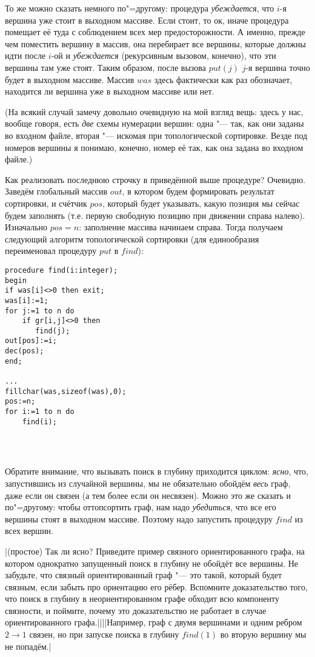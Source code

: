 То же можно сказать немного по"=другому: процедура \textit{убеждается}, что $i$-я  вершина уже 
стоит в выходном массиве. Если стоит, то ок, иначе процедура помещает её туда с соблюдением всех мер 
предосторожности. А именно, прежде чем поместить вершину в массив, она перебирает все вершины, 
которые должны идти после $i$-ой и \textit{убеждается} (рекурсивным вызовом, конечно), что эти 
вершины там уже стоят. Таким образом, после вызова $put(j)$ $j$-я вершина точно будет в выходном 
массиве. Массив $was$ здесь фактически как раз обозначает, находится ли вершина уже в 
выходном массиве или нет.

(На всякий случай замечу довольно очевидную на мой взгляд вещь: здесь у нас, вообще говоря, есть 
\textit{две} схемы нумерации вершин: одна "--- так, как они заданы во входном файле, вторая "--- 
искомая при топологической сортировке. Везде под номеров вершины я понимаю, конечно, номер её так, 
как она задана во входном файле.)

Как реализовать последнюю строчку в приведённой выше процедуре? Очевидно. Заведём глобальный массив 
$out$, в котором будем формировать результат сортировки, и счётчик $pos$, который будет указывать, 
какую позиция мы сейчас будем заполнять (т.е. первую свободную позицию при движении справа налево). 
Изначально $pos=n$: заполнение массива начинаем 
справа. Тогда получаем следующий алгоритм топологической сортировки (для единообразия переименовал 
процедуру $put$ в $find$):
\begin{codesample}\begin{verbatim}
procedure find(i:integer);
begin
if was[i]<>0 then exit;
was[i]:=1;
for j:=1 to n do
    if gr[i,j]<>0 then
       find(j);
out[pos]:=i;
dec(pos);
end;

...
fillchar(was,sizeof(was),0);
pos:=n;
for i:=1 to n do
    find(i);
    
   
       
\end{verbatim}
\end{codesample}

Обратите внимание, что вызывать поиск в глубину приходится циклом: \textit{ясно}, что, запустившись из 
случайной вершины, мы не обязательно обойдём \textit{весь} граф, даже если он связен (а тем более 
если он несвязен). Можно это же сказать и по"=другому: чтобы оттопсортить граф, нам надо 
\textit{убедиться}, что все его вершины стоят в выходном массиве. Поэтому надо запустить процедуру 
$find$ из всех вершин.

\task|(простое) Так ли ясно? Приведите пример связного ориентированного графа, на котором 
однократно запущенный поиск в глубину не обойдёт все вершины. Не забудьте, что связный 
ориентированный граф "--- это такой, который  
будет связным, если забыть про ориентацию его рёбер. Вспомните доказательство того, что поиск в 
глубину в неориентированном графе обходит всю компоненту связности, и поймите, почему это 
доказательство не работает в случае ориентированного графа.||||Например, граф с двумя вершинами и одним ребром $2\to 1$ связен, но при запуске
поиска в глубину $find(1)$ во вторую вершину мы не попадём.|\label{connecteddirect}

